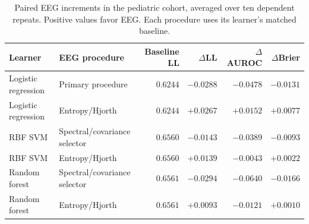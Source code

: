 \begin{table}[t]
\centering
\caption{Paired EEG increments in the pediatric cohort, averaged over ten dependent repeats. Positive values favor EEG. Each procedure uses its learner's matched baseline.}
\label{tab:learner}
\setlength{\tabcolsep}{4pt}
\begin{tabularx}{\textwidth}{@{}>{\raggedright\arraybackslash}p{2.8cm}>{\raggedright\arraybackslash}Xrrrr@{}}
\toprule
Learner & EEG procedure & \shortstack{Baseline\\LL} & $\Delta$LL & $\Delta$AUROC & $\Delta$Brier\\
\midrule
Logistic regression & Primary procedure & $0.6244$ & $-0.0288$ & $-0.0478$ & $-0.0131$\\
Logistic regression & Entropy/Hjorth & $0.6244$ & $+0.0267$ & $+0.0152$ & $+0.0077$\\
RBF SVM & Spectral/covariance selector & $0.6560$ & $-0.0143$ & $-0.0389$ & $-0.0093$\\
RBF SVM & Entropy/Hjorth & $0.6560$ & $+0.0139$ & $-0.0043$ & $+0.0022$\\
Random forest & Spectral/covariance selector & $0.6561$ & $-0.0294$ & $-0.0640$ & $-0.0166$\\
Random forest & Entropy/Hjorth & $0.6561$ & $+0.0093$ & $-0.0121$ & $+0.0010$\\
\bottomrule\end{tabularx}
\end{table}
